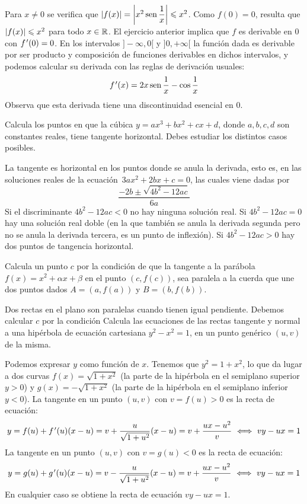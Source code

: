 \begin{ejercicios resueltos}
\sol Para $x\neq0$ se verifica que $\lvert{f(x)}\rvert=\left\lvert{x^{2}\operatorname{sen}\dfrac{1}{x}}\right\rvert\leqslant x^{2}$.
Como $f(0)=0$, resulta que $\lvert{f(x)}\rvert\leqslant x^{2}$ para todo $x\in\mathbb R$.
El ejercicio anterior implica que $f$ es derivable en $0$ con $f\mbox{$^{\mspace{2mu}\prime}$}(0)=0$.
En los intervalos $]-\infty,0[$ y $]0,+\infty[$ la función dada
es derivable por ser producto y composición de funciones derivables
en dichos intervalos, y podemos calcular su derivada con las reglas
de derivación usuales: 
\[
f\mbox{$^{\mspace{2mu}\prime}$}(x)=2x\operatorname{sen}\dfrac{1}{x}-\cos\dfrac{1}{x}
\]
Observa que esta derivada tiene una discontinuidad esencial en $0$.\hecho

\resuelto Calcula los puntos en que la cúbica $y=ax^{3}+bx^{2}+cx+d$,
donde $a,b,c,d$ son constantes reales, tiene tangente horizontal.
Debes estudiar los distintos casos posibles.

\sol La tangente es horizontal en los puntos donde se anula la derivada,
esto es, en las soluciones reales de la ecuación $\,3ax^{2}+2bx+c=0$,
las cuales viene dadas por 
\[
\dfrac{-2b\pm\sqrt{4b^{2}-12ac}}{6a}
\]
Si el discriminante $4b^{2}-12ac<0$ no hay ninguna solución real.
Si $4b^{2}-12ac=0$ hay una solución real doble (en la que también
se anula la derivada segunda pero no se anula la derivada tercera,
es un punto de inflexión). Si $4b^{2}-12ac>0$ hay dos puntos de tangencia
horizontal.\hecho

\resuelto Calcula un punto $c$ por la condición de que la tangente
a la parábola $f(x)=x^{2}+\alpha x+\beta$ en el punto $(c,f(c))$,
sea paralela a la cuerda que une dos puntos dados $A=(a,f(a))$ y
$B=(b,f(b))$.

\sol Dos rectas en el plano son paralelas cuando tienen igual pendiente.
Debemos calcular $c$ por la condición {} \hecho \resuelto Calcula las ecuaciones de las rectas tangente
y normal a una hipérbola de ecuación cartesiana $y^{2}-x^{2}=1$,
en un punto genérico $(u,v)$ de la misma.

\sol Podemos expresar $y$ como función de $x$. Tenemos que $y^{2}=1+x^{2}$,
lo que da lugar a dos curvas $f(x)=\sqrt{1+x^{2}}$ (la parte de la
hipérbola en el semiplano superior $y>0$) y $g(x)=-\sqrt{1+x^{2}}$
(la parte de la hipérbola en el semiplano inferior $y<0$). La tangente
en un punto $(u,v)$ con $v=f(u)>0$ es la recta de ecuación: 
\[
y=f(u)+f\tl(u)(x-u)=v+\dfrac{u}{\sqrt{1+u^{2}}}(x-u)=v+\dfrac{ux-u^{2}}{v}\ \Longleftrightarrow\ vy-ux=1
\]
La tangente en un punto $(u,v)$ con $v=g(u)<0$ es la recta de ecuación:
\[
y=g(u)+g\tl(u)(x-u)=v-\dfrac{u}{\sqrt{1+u^{2}}}(x-u)=v+\dfrac{ux-u^{2}}{v}\ \Longleftrightarrow\ vy-ux=1
\]
En cualquier caso se obtiene la recta de ecuación $vy-ux=1$.


\end{ejercicios resueltos}
